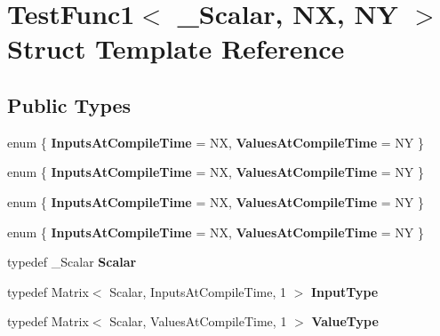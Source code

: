 \hypertarget{struct_test_func1}{}\section{Test\+Func1$<$ \+\_\+\+Scalar, NX, NY $>$ Struct Template Reference}
\label{struct_test_func1}
\subsection*{Public Types}
\begin{DoxyCompactItemize}
\item 
\mbox{\label{struct_test_func1_a9e5c16066e585faed23e357f061fe5bf}} 
enum \{ {\bfseries Inputs\+At\+Compile\+Time} = NX, 
{\bfseries Values\+At\+Compile\+Time} = NY
 \}
\item 
\mbox{\label{struct_test_func1_ac6ae80835e02bef749fe827e83ba8c8b}} 
enum \{ {\bfseries Inputs\+At\+Compile\+Time} = NX, 
{\bfseries Values\+At\+Compile\+Time} = NY
 \}
\item 
\mbox{\label{struct_test_func1_a0404d85de72c14f2157406e3d8a747ab}} 
enum \{ {\bfseries Inputs\+At\+Compile\+Time} = NX, 
{\bfseries Values\+At\+Compile\+Time} = NY
 \}
\item 
\mbox{\label{struct_test_func1_adf7a4f0759be37ab2513c8c91ef3b291}} 
enum \{ {\bfseries Inputs\+At\+Compile\+Time} = NX, 
{\bfseries Values\+At\+Compile\+Time} = NY
 \}
\item 
\mbox{\label{struct_test_func1_aaa929c4e8eb082e65e2b8fecb4d4025f}} 
typedef \+\_\+\+Scalar {\bfseries Scalar}
\item 
\mbox{\label{struct_test_func1_a35f245162f06a1363c9dcbcb4729dd7e}} 
typedef Matrix$<$ Scalar, Inputs\+At\+Compile\+Time, 1 $>$ {\bfseries Input\+Type}
\item 
\mbox{\label{struct_test_func1_a73cc5db75fb583fadd7e2f7d7b736ed5}} 
typedef Matrix$<$ Scalar, Values\+At\+Compile\+Time, 1 $>$ {\bfseries Value\+Type}
\item 
\mbox{\label{struct_test_func1_a7d784c423cd16d95e9c7af75316d0155}} 

\end{DoxyCompactItemize}

